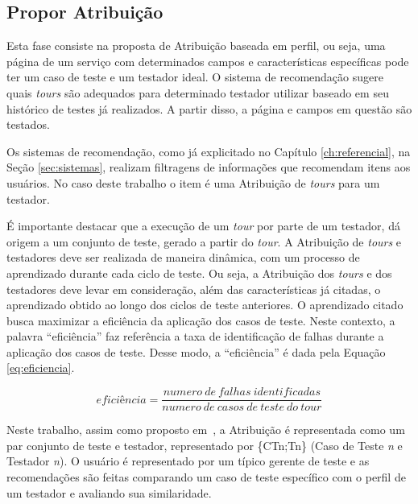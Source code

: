 \subsection{Propor Atribuição}

 Esta fase consiste na proposta de Atribuição baseada em perfil, ou seja, uma página de um serviço com determinados campos e características específicas pode ter um caso de teste e um testador ideal. O sistema de recomendação sugere quais \textit{tours} são adequados para determinado testador utilizar baseado em seu histórico de testes já realizados. A partir disso, a página e campos em questão são testados.

 Os sistemas de recomendação, como já explicitado no Capítulo \ref{ch:referencial}, na Seção \ref{sec:sistemas}, realizam filtragens de informações que recomendam itens aos usuários. No caso deste trabalho o item é uma Atribuição de \textit{tours} para um testador.

É importante destacar que a execução de um \textit{tour} por parte de um testador, dá origem a um conjunto de teste, gerado a partir do \textit{tour}. A Atribuição de \textit{tours} e testadores deve ser realizada de maneira dinâmica, com um processo de aprendizado durante cada ciclo de teste. Ou seja, a Atribuição dos \textit{tours} e dos testadores deve levar em consideração, além das características já citadas, o aprendizado obtido ao longo dos ciclos de teste anteriores. O aprendizado citado busca maximizar a eficiência da aplicação dos casos de teste. Neste contexto, a palavra ``eficiência'' faz referência a taxa de identificação de falhas durante a aplicação dos casos de teste. Desse modo, a ``eficiência'' é dada pela Equação \ref{eq:eficiencia}.

 \begin{equation}
 \label{eq:eficiencia}
    eficiência = \frac{numero \ de \ falhas\ identificadas}{numero\ de\ casos\ de\ teste\ do\ tour}
 \end{equation}



Neste trabalho, assim como proposto em~\cite{miranda2012recommender}, a Atribuição é representada como um par conjunto de teste e testador, representado por \{CTn;Tn\} (Caso de Teste \emph{n} e Testador \emph{n}). O usuário é representado por um típico gerente de teste e as recomendações são feitas comparando um caso de teste específico com o perfil de um testador e avaliando sua similaridade.

